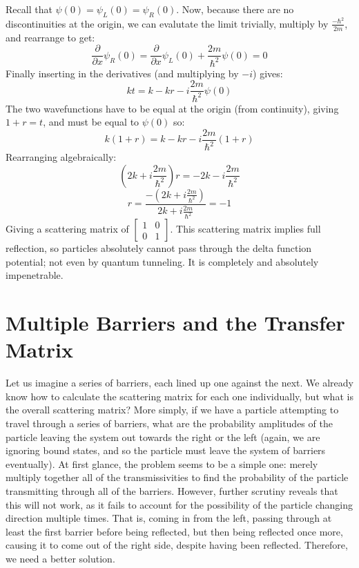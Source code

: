 \documentclass{report}
\begin{document}
Recall that $\psi(0) = \psi_L(0) = \psi_R(0)$. Now, because there are no discontinuities at the origin, we can evalutate the limit trivially, multiply by $\frac{-\hbar^2}{2m}$, and rearrange to get:
\[
\frac{\partial}{\partial x} \psi_R(0) = \frac{\partial}{\partial x} \psi_L(0) + \frac{2m}{\hbar^2}\psi(0) = 0
\]
Finally inserting in the derivatives (and multiplying by $-i$) gives:
\[
kt = k - kr - i\frac{2m}{\hbar^2} \psi(0)
\]
The two wavefunctions have to be equal at the origin (from continuity), giving $1 + r = t$, and must be equal to $\psi(0)$ so:
\[
k(1+r) = k - kr - i\frac{2m}{\hbar^2} (1 + r)
\]
Rearranging algebraically:
\[
(2k + i\frac{2m}{\hbar^2})r = -2k - i\frac{2m}{\hbar^2}
\]
\[
r = \frac{-(2k + i\frac{2m}{\hbar^2})}{2k + i\frac{2m}{\hbar^2}} = -1
\]
Giving a scattering matrix of $\begin{bmatrix} 1 & 0 \\ 0 & 1 \end{bmatrix}$. This scattering matrix implies full reflection, so particles absolutely cannot pass through the delta function potential; not even by quantum tunneling. It is completely and absolutely impenetrable.

\section{Multiple Barriers and the Transfer Matrix}
Let us imagine a series of barriers, each lined up one against the next. We already know how to calculate the scattering matrix for each one individually, but what is the overall scattering matrix? More simply, if we have a particle attempting to travel through a series of barriers, what are the probability amplitudes of the particle leaving the system out towards the right or the left (again, we are ignoring bound states, and so the particle must leave the system of barriers eventually). At first glance, the problem seems to be a simple one: merely multiply together all of the transmissivities to find the probability of the particle transmitting through all of the barriers. However, further scrutiny reveals that this will not work, as it fails to account for the possibility of the particle changing direction multiple times. That is, coming in from the left, passing through at least the first barrier before being reflected, but then being reflected once more, causing it to come out of the right side, despite having been reflected. Therefore, we need a better solution.
\end{document}
